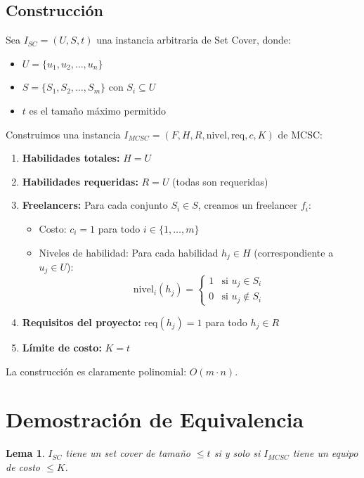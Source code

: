\documentclass[11pt]{article}
\newtheorem{lemma}{Lema}
\begin{document}
	\subsection{Construcción}
	Sea $I_{SC} = (U, S, t)$ una instancia arbitraria de Set Cover, donde:
	\begin{itemize}
		\item $U = \{u_1, u_2, \ldots, u_n\}$
		\item $S = \{S_1, S_2, \ldots, S_m\}$ con $S_i \subseteq U$
		\item $t$ es el tamaño máximo permitido
	\end{itemize}
	
	Construimos una instancia $I_{MCSC} = (F, H, R, \text{nivel}, \text{req}, c, K)$ de MCSC:
	
	\begin{enumerate}
		\item \textbf{Habilidades totales:} $H = U$
		\item \textbf{Habilidades requeridas:} $R = U$ (todas son requeridas)
		\item \textbf{Freelancers:} Para cada conjunto $S_i \in S$, creamos un freelancer $f_i$:
		\begin{itemize}
			\item Costo: $c_i = 1$ para todo $i \in \{1, \ldots, m\}$
			\item Niveles de habilidad: Para cada habilidad $h_j \in H$ (correspondiente a $u_j \in U$):
			\[
			\text{nivel}_i(h_j) = \begin{cases} 
				1 & \text{si } u_j \in S_i \\
				0 & \text{si } u_j \notin S_i
			\end{cases}
			\]
		\end{itemize}
		\item \textbf{Requisitos del proyecto:} $\text{req}(h_j) = 1$ para todo $h_j \in R$
		\item \textbf{Límite de costo:} $K = t$
	\end{enumerate}
	
	La construcción es claramente polinomial: $O(m \cdot n)$.

	\section{Demostración de Equivalencia}
	
	\begin{lemma}
		$I_{SC}$ tiene un set cover de tamaño $\leq t$ si y solo si $I_{MCSC}$ tiene un equipo de costo $\leq K$.
	\end{lemma}
	
\end{document}
